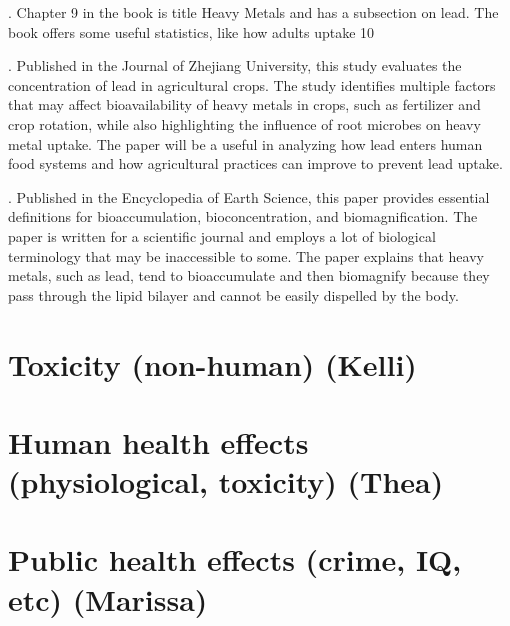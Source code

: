 \documentclass{article}\usepackage[]{graphicx}\usepackage[]{color}
\begin{document}
.
Chapter 9 in the book is title Heavy Metals and has a subsection on lead. The book offers some useful statistics, like how adults uptake 10%

.
Published in the Journal of Zhejiang University, this study evaluates the concentration of lead in agricultural crops. The study identifies multiple factors that may affect bioavailability of heavy metals in crops, such as fertilizer and crop rotation, while also highlighting the influence of root microbes on heavy metal uptake. The paper will be a useful in analyzing how lead enters human food systems and how agricultural practices can improve to prevent lead uptake. 

.
Published in the Encyclopedia of Earth Science, this paper provides essential definitions for bioaccumulation, bioconcentration, and biomagnification. The paper is written for a scientific journal and employs a lot of biological terminology that may be inaccessible to some. The paper explains that heavy metals, such as lead, tend to bioaccumulate and then biomagnify because they pass through the lipid bilayer and cannot be easily dispelled by the body. 


\section{Toxicity (non-human) (Kelli)}

\section{Human health effects (physiological, toxicity) (Thea)}

\section{Public health effects (crime, IQ, etc) (Marissa)}
\end{document}

